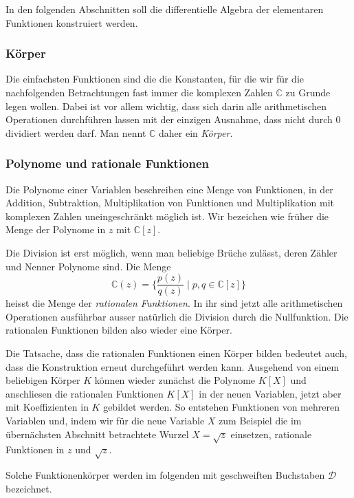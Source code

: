 In den folgenden Abschnitten soll die differentielle Algebra
der elementaren Funktionen konstruiert werden.

\subsubsection{Körper}
Die einfachsten Funktionen sind die die Konstanten, für die wir
für die nachfolgenden Betrachtungen fast immer die komplexen Zahlen
$\mathbb{C}$
zu Grunde legen wollen.
Dabei ist vor allem wichtig, dass sich darin alle arithmetischen
Operationen durchführen lassen mit der einzigen Ausnahme, dass
nicht durch $0$ dividiert werden darf.
Man nennt $\mathbb{C}$ daher ein {\em Körper}.
%
\label{buch:integrale:def:koerper}

\subsubsection{Polynome und rationale Funktionen}
Die Polynome einer Variablen beschreiben eine Menge von
Funktionen, in der Addition, Subtraktion, Multiplikation
von Funktionen und Multiplikation mit komplexen Zahlen
uneingeschränkt möglich ist.
Wir bezeichen wie früher die Menge der Polynome in $z$ mit
$\mathbb{C}[z]$.

Die Division ist erst möglich, wenn man beliebige Brüche
zulässt, deren Zähler und Nenner Polynome sind.
Die Menge
\[
\mathbb{C}(z)
=
\biggl\{
\frac{p(z)}{q(z)}
\;\bigg|\;
p,q\in \mathbb{C}[z]
\biggr\}
\]
heisst die Menge der {\em rationalen Funktionen}.
\label{buch:integrale:def:rationalefunktion}
%
%
In ihr sind jetzt alle arithmetischen Operationen ausführbar
ausser natürlich die Division durch die Nullfunktion.
Die rationalen Funktionen bilden also wieder eine Körper.

Die Tatsache, dass die rationalen Funktionen einen Körper
bilden bedeutet auch, dass die Konstruktion erneut durchgeführt
werden kann.
Ausgehend von einem beliebigen Körper $K$ können wieder zunächst
die Polynome $K[X]$ und anschliesen die rationalen Funktionen $K[X]$
in der neuen Variablen, jetzt aber mit Koeffizienten in $K$
gebildet werden.
So entstehen Funktionen von mehreren Variablen und, indem
wir für die neue Variable $X$ zum Beispiel die im übernächsten
Abschnitt betrachtete Wurzel $X=\sqrt{z}$
einsetzen, rationale Funktionen in $z$ und $\sqrt{z}$.

Solche Funktionenkörper werden im folgenden mit geschweiften
Buchstaben $\mathscr{D}$ bezeichnet.
%

